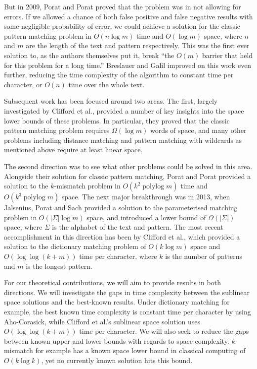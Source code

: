 \documentclass[a4paper,11pt]{article}
\DeclareMathOperator\polylog{polylog}
\begin{document}
    But in 2009, Porat and Porat \cite{5438620} proved that the problem was in not allowing for errors. If we allowed a chance of both false positive and false negative results with some negligible probability of error, we could achieve a solution for the classic pattern matching problem in $O(n\log m)$ time and $O(\log m)$ space, where $n$ and $m$ are the length of the text and pattern respectively. This was the first ever solution to, as the authors themselves put it, break ``the $O(m)$ barrier that held for this problem for a long time.'' Breslauer and Galil \cite{Breslauer:2014:RSS:2660854.2635814} improved on this work even further, reducing the time complexity of the algorithm to constant time per character, or $O(n)$ time over the whole text.

    Subsequent work has been focused around two areas. The first, largely investigated by Clifford et al.\@ \cite{DBLP:journals/corr/abs-1106-4412}, provided a number of key insights into the space lower bounds of these problems. In particular, they proved that the classic pattern matching problem requires $\Omega(\log m)$ words of space, and many other problems including distance matching and pattern matching with wildcards as mentioned above require at least linear space.

    The second direction was to see what other problems could be solved in this area. Alongside their solution for classic pattern matching, Porat and Porat \cite{5438620} provided a solution to the $k$-mismatch problem in $O(k^2\polylog m)$ time and $O(k^3\polylog m)$ space. The next major breakthrough was in 2013, when Jalsenius, Porat and Sach \cite{JPS:2013} provided a solution to the parameterised matching problem in $O(|\Sigma|\log m)$ space, and introduced a lower bound of $\Omega(|\Sigma|)$ space, where $\Sigma$ is the alphabet of the text and pattern. The most recent accomplishment in this direction has been by Clifford et al.\@ \cite{2015arXiv150406242C}, which provided a solution to the dictionary matching problem of $O(k\log m)$ space and $O(\log\log(k + m))$ time per character, where $k$ is the number of patterns and $m$ is the longest pattern.

    For our theoretical contributions, we will aim to provide results in both directions. We will investigate the gaps in time complexity between the sublinear space solutions and the best-known results. Under dictionary matching for example, the best known time complexity is constant time per character by using Aho-Corasick, while Clifford et al.'s sublinear space solution uses $O(\log\log(k + m))$ time per character. We will also seek to reduce the gaps between known upper and lower bounds with regards to space complexity. $k$-mismatch for example has a known space lower bound in classical computing of $O(k\log k)$, yet no currently known solution hits this bound.
\end{document}
